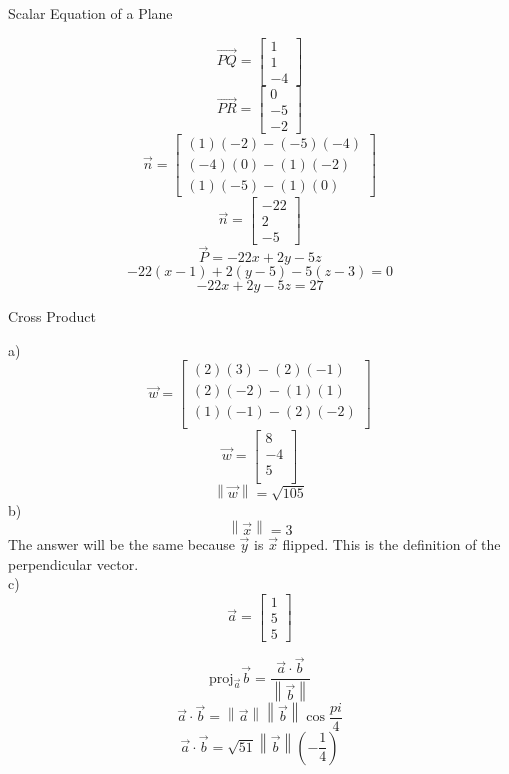 \documentclass[12pt]{article}
\newcommand{\dbarl}{\left\lVert}
\newcommand{\dbarr}{\right\rVert}
\newenvironment{problem}[2][Problem]{\begin{trivlist}
\item[\hskip \labelsep {\bfseries #1}\hskip \labelsep {\bfseries #2.}]}{\end{trivlist}}
\begin{document}
\begin{problem}{6}
	Scalar Equation of a Plane
\end{problem}
	\[\vec{ PQ} = \left[\begin{matrix}1\\1\\-4\end{matrix}\right]\]
	\[\vec{ PR} = \left[\begin{matrix}0\\-5\\-2\end{matrix}\right]\]
	\[\vec n = \left[\begin{matrix}(1)(-2) - (-5)(-4)\\(-4)(0) - (1)(-2)\\(1)(-5) - (1)(0)\end{matrix}\right]\]
	\[\vec n = \left[\begin{matrix}-22\\2\\-5\end{matrix}\right]\]
	\[\vec P = -22x + 2y -5z\]
	\[-22(x-1) + 2(y-5) -5(z-3) = 0\]
	\[-22x +2y -5z = 27\]
\begin{problem}{7}
	Cross Product
\end{problem}
a)\\
	\[\vec w = \left[\begin{matrix}(2)(3) - (2)(-1)\\(2)(-2) - (1)(1)\\(1)(-1) - (2)(-2)\\\end{matrix}\right]\]
	\[\vec w = \left[\begin{matrix}	8\\-4\\5\\\end{matrix}\right]\]
	\[\dbarl \vec w \dbarr = \sqrt{105}\]
b)\\
	\[\dbarl \vec x \dbarr = 3\]
	The answer will be the same because $\vec y$ is $\vec x$ flipped. This is the definition of the perpendicular vector.\\
c)\\
	\[\vec a = \left[\begin{matrix}1\\5\\5\end{matrix}\right]\]
	
	\[\text{proj}_{\vec a}\vec b = \frac{\vec a \cdot \vec b}{\dbarl \vec b \dbarr}\]
	\[\vec a \cdot \vec b = \dbarl\vec a \dbarr \dbarl \vec b \dbarr \cos{\frac{pi}{4}}\]
	\[\vec a \cdot \vec b = \sqrt{51} \dbarl \vec b \dbarr (-\frac{1}{4})\]
	
\end{document}
